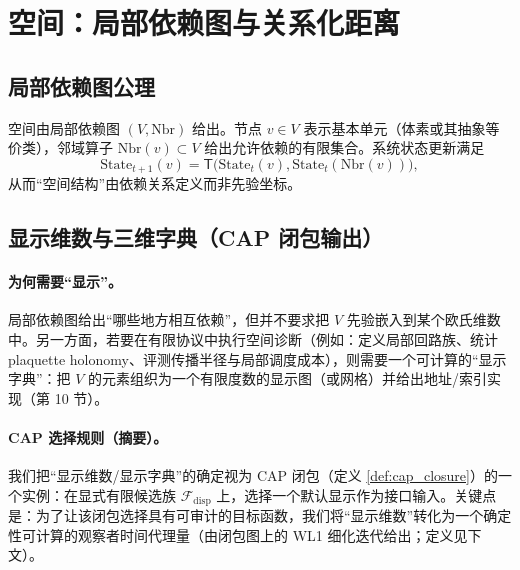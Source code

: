 \section{空间：局部依赖图与关系化距离}

\subsection{局部依赖图公理}

\begin{definition}[局部依赖图]\label{def:local_dependency_graph}
空间由局部依赖图 $(V,\mathrm{Nbr})$ 给出。节点 $v\in V$ 表示基本单元（体素或其抽象等价类），邻域算子 $\mathrm{Nbr}(v)\subset V$ 给出允许依赖的有限集合。系统状态更新满足
$$
\mathrm{State}_{t+1}(v)=\mathsf T\bigl(\mathrm{State}_t(v),\mathrm{State}_t(\mathrm{Nbr}(v))\bigr),
$$
从而“空间结构”由依赖关系定义而非先验坐标。
\end{definition}

\subsection{显示维数与三维字典（CAP 闭包输出）}

\paragraph{为何需要“显示”。}
\InterfaceTag
局部依赖图给出“哪些地方相互依赖”，但并不要求把 $V$ 先验嵌入到某个欧氏维数中。另一方面，若要在有限协议中执行空间诊断（例如：定义局部回路族、统计 plaquette holonomy、评测传播半径与局部调度成本），则需要一个可计算的“显示字典”：把 $V$ 的元素组织为一个有限度数的显示图（或网格）并给出地址/索引实现（第 10 节）。

\paragraph{CAP 选择规则（摘要）。}
\AuditTag
我们把“显示维数/显示字典”的确定视为 CAP 闭包（定义 \ref{def:cap_closure}）的一个实例：在显式有限候选族 $\mathcal F_{\mathrm{disp}}$ 上，选择一个默认显示作为接口输入。关键点是：为了让该闭包选择具有可审计的目标函数，我们将“显示维数”转化为一个确定性可计算的观察者时间代理量（由闭包图上的 WL1 细化迭代给出；定义见下文）。\par

